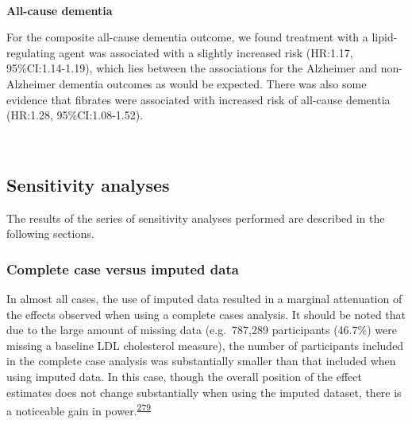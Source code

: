 \documentclass[a4paper, twoside]{templates/ociamthesis}
\begin{document}
~

\textbf{All-cause dementia}

For the composite all-cause dementia outcome, we found treatment with a lipid-regulating agent was associated with a slightly increased risk (HR:1.17, 95\%CI:1.14-1.19), which lies between the associations for the Alzheimer and non-Alzheimer dementia outcomes as would be expected. There was also some evidence that fibrates were associated with increased risk of all-cause dementia (HR:1.28, 95\%CI:1.08-1.52).

~

\hypertarget{sensitivity-analyses-1}{%
\subsection{Sensitivity analyses}\label{sensitivity-analyses-1}}

The results of the series of sensitivity analyses performed are described in the following sections.

\hypertarget{complete-case-versus-imputed-data}{%
\subsubsection{Complete case versus imputed data}\label{complete-case-versus-imputed-data}}

In almost all cases, the use of imputed data resulted in a marginal attenuation of the effects observed when using a complete cases analysis. It should be noted that due to the large amount of missing data (e.g.~787,289 participants (46.7\%) were missing a baseline LDL cholesterol measure), the number of participants included in the complete case analysis was substantially smaller than that included when using imputed data. In this case, though the overall position of the effect estimates does not change substantially when using the imputed dataset, there is a noticeable gain in power.\textsuperscript{\protect\hyperlink{ref-sterne2009}{279}}

~
\end{document}
